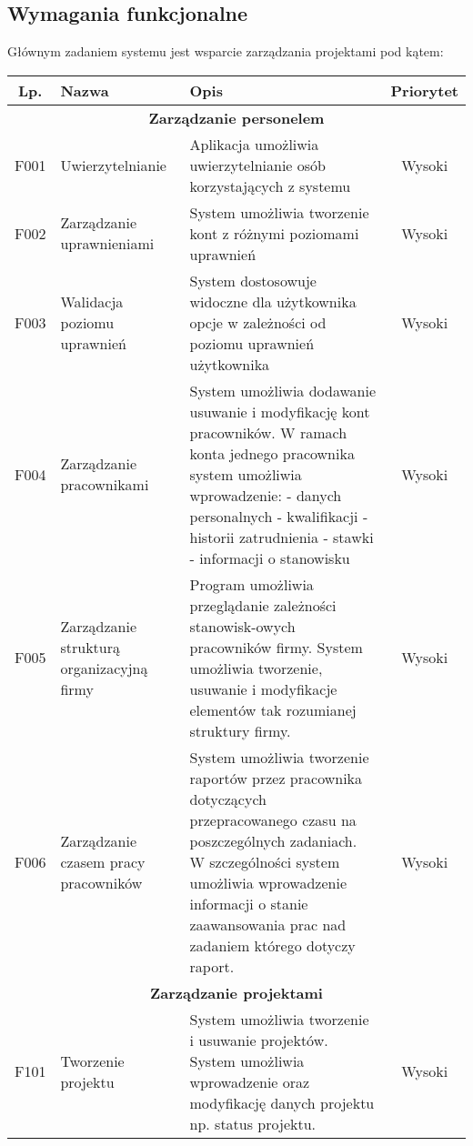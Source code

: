 \subsection{Wymagania funkcjonalne}
Głównym zadaniem systemu jest wsparcie zarządzania projektami pod kątem:

\begin{tabularx}{\textwidth}{|c|X|X|c|}
\hline 
Lp. & Nazwa & Opis & Priorytet \\ 
\hline 
\multicolumn{4}{|c|}{\textbf{Zarządzanie personelem}} \\
\hline 
F001 & Uwierzytelnianie & Aplikacja umożliwia uwierzytelnianie osób korzystających z systemu  & Wysoki \\ 
\hline 
F002 & Zarządzanie uprawnieniami & System umożliwia tworzenie kont z różnymi poziomami uprawnień & Wysoki \\ 
\hline 
F003 & Walidacja poziomu uprawnień & System dostosowuje widoczne dla użytkownika opcje w zależności od poziomu uprawnień użytkownika  & Wysoki \\ 
\hline 
F004 & Zarządzanie pracownikami & System umożliwia dodawanie usuwanie i modyfikację kont pracowników. W ramach konta jednego pracownika system umożliwia wprowadzenie: \newline
- danych personalnych \newline
- kwalifikacji \newline
- historii zatrudnienia \newline 
- stawki \newline
- informacji o stanowisku
& Wysoki \\
\hline 
F005 & Zarządzanie strukturą organizacyjną firmy & Program umożliwia przeglądanie zależności stanowisk-owych pracowników firmy. System umożliwia tworzenie, usuwanie i modyfikacje elementów tak rozumianej struktury firmy. & Wysoki \\ 
\hline 
F006 & Zarządzanie czasem pracy pracowników & System umożliwia tworzenie raportów przez pracownika dotyczących przepracowanego czasu na poszczególnych zadaniach. W szczególności system umożliwia wprowadzenie informacji o stanie zaawansowania prac nad zadaniem którego dotyczy raport. & Wysoki \\ 
\hline 
\multicolumn{4}{|c|}{\textbf{Zarządzanie projektami}} \\
\hline 
F101 &  Tworzenie projektu & System umożliwia tworzenie i usuwanie projektów. System umożliwia wprowadzenie oraz modyfikację danych projektu np. status projektu. & Wysoki \\ 

\end{tabularx}
